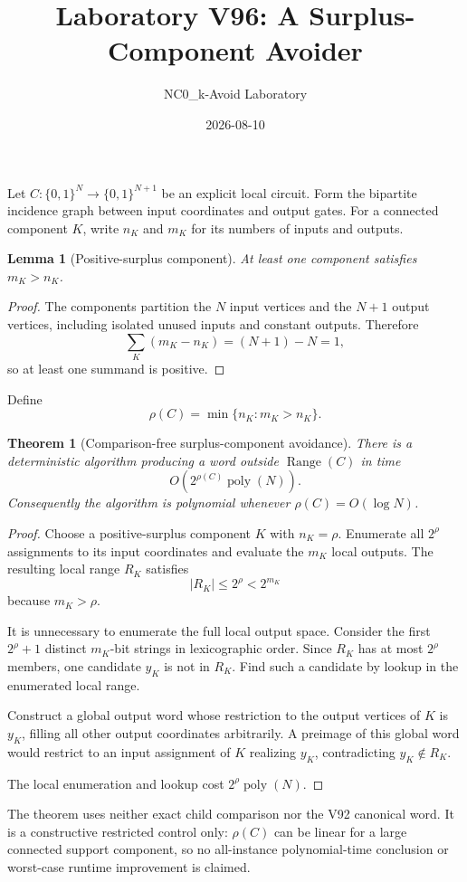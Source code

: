 \documentclass[11pt]{article}
\title{Laboratory V96: A Surplus-Component Avoider}
\author{NC0\_k-Avoid Laboratory}
\date{2026-08-10}
\newtheorem{theorem}{Theorem}
\newtheorem{lemma}{Lemma}
\newcommand{\bits}{\{0,1\}}
\begin{document}
\maketitle

Let $C:\bits^N\to\bits^{N+1}$ be an explicit local circuit.  Form the bipartite
incidence graph between input coordinates and output gates.  For a connected
component $K$, write $n_K$ and $m_K$ for its numbers of inputs and outputs.

\begin{lemma}[Positive-surplus component]
At least one component satisfies $m_K>n_K$.
\end{lemma}

\begin{proof}
The components partition the $N$ input vertices and the $N+1$ output vertices,
including isolated unused inputs and constant outputs.  Therefore
\[
 \sum_K(m_K-n_K)=(N+1)-N=1,
\]
so at least one summand is positive.
\end{proof}

Define
\[
 \rho(C)=\min\{n_K:m_K>n_K\}.
\]

\begin{theorem}[Comparison-free surplus-component avoidance]
There is a deterministic algorithm producing a word outside
$\operatorname{Range}(C)$ in time
\[
 O\!\left(2^{\rho(C)}\operatorname{poly}(N)\right).
\]
Consequently the algorithm is polynomial whenever $\rho(C)=O(\log N)$.
\end{theorem}

\begin{proof}
Choose a positive-surplus component $K$ with $n_K=\rho$.  Enumerate all
$2^\rho$ assignments to its input coordinates and evaluate the $m_K$ local
outputs.  The resulting local range $R_K$ satisfies
\[
 |R_K|\le2^\rho<2^{m_K}
\]
because $m_K>\rho$.

It is unnecessary to enumerate the full local output space.  Consider the
first $2^\rho+1$ distinct $m_K$-bit strings in lexicographic order.  Since
$R_K$ has at most $2^\rho$ members, one candidate $y_K$ is not in $R_K$.
Find such a candidate by lookup in the enumerated local range.

Construct a global output word whose restriction to the output vertices of
$K$ is $y_K$, filling all other output coordinates arbitrarily.  A preimage of
this global word would restrict to an input assignment of $K$ realizing
$y_K$, contradicting $y_K\notin R_K$.

The local enumeration and lookup cost $2^\rho\operatorname{poly}(N)$.
\end{proof}

The theorem uses neither exact child comparison nor the V92 canonical word.  It
is a constructive restricted control only: $\rho(C)$ can be linear for a large
connected support component, so no all-instance polynomial-time conclusion or
worst-case runtime improvement is claimed.
\end{document}
